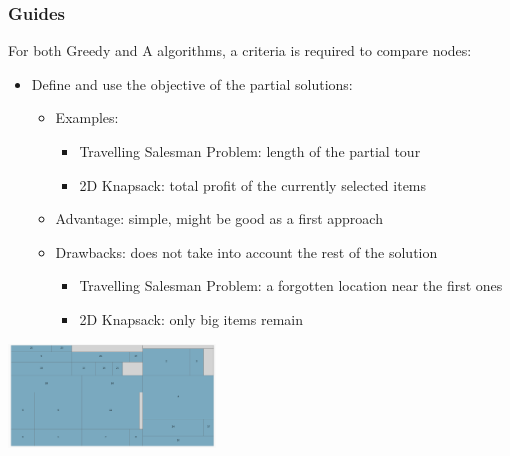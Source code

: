 \documentclass[10pt]{beamer}
\begin{document}
\begin{frame}
  \frametitle{Guides}

  For both Greedy and A algorithms, a criteria is required to compare nodes:
  \begin{itemize}
    \item Define and use the objective of the partial solutions:
      \begin{itemize}
        \item Examples:
          \begin{itemize}
            \item Travelling Salesman Problem: length of the partial tour
            \item 2D Knapsack: total profit of the currently selected items
          \end{itemize}
        \item Advantage: simple, might be good as a first approach
        \item Drawbacks: does not take into account the rest of the solution
          \begin{itemize}
            \item Travelling Salesman Problem: a forgotten location near the first ones
            \item 2D Knapsack: only big items remain
          \end{itemize}
      \end{itemize}
  \end{itemize}

  \pause
  \centering
  \begin{minipage}[t]{0.30\linewidth}
    \centering
    \def\svgwidth{\columnwidth}
    
  \end{minipage}
  \begin{minipage}[t]{0.55\linewidth}
    \begin{center}
      \includegraphics[width=5.5cm]{knapsack_guide_4.png}
    \end{center}
  \end{minipage}
\end{frame}
\end{document}
